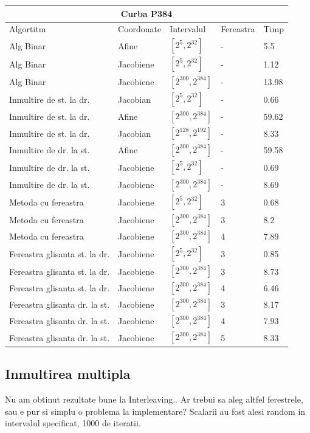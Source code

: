 \begin{tabular}{ |p{5cm}||p{3cm}|p{3cm}|p{2cm}|p{1cm}|  }
 \hline
 \multicolumn{5}{|c|}{Curba P384} \\
 \hline
 Algortitm& Coordonate &Intervalul &Fereastra &Timp\\
 \hline
 Alg Binar & Afine  &$[2^{5},2^{32}]$& - & 5.5\\
 Alg Binar&Jacobiene  & $[2^{5},2^{32}]$ & - & 1.12\\
 Alg Binar&Jacobiene  & $[2^{300},2^{384}]$ & - & 13.98\\
 Inmultire de st. la dr. & Jacobian & $[2^{5},2^{32}]$& - & 0.66\\
 Inmultire de st. la dr. & Afine & $[2^{300},2^{384}]$& - & 59.62\\
 Inmultire de st. la dr. & Jacobian & $[2^{128},2^{192}]$& - & 8.33\\
 Inmultire de dr. la st. &Afine & $[2^{300},2^{384}]$ & - & 59.58\\
 Inmultire de dr. la st. &Jacobiene & $[2^{5},2^{32}]$ & - & 0.69\\
 Inmultire de dr. la st. &Jacobiene & $[2^{300},2^{384}]$ & - & 8.69\\
 Metoda cu fereastra& Jacobiene & $[2^{5},2^{32}]$ & 3 & 0.68\\
 Metoda cu fereastra& Jacobiene & $[2^{300},2^{384}]$ & 3 & 8.2\\
 Metoda cu fereastra& Jacobiene & $[2^{300},2^{384}]$ & 4 & 7.89\\
 Fereastra glisanta st. la dr.& Jacobiene  & $[2^{5},2^{32}]$& 3 & 0.85\\
 Fereastra glisanta st. la dr.& Jacobiene  & $[2^{300},2^{384}]$& 3 & 8.73\\
  Fereastra glisanta st. la dr.& Jacobiene  & $[2^{300},2^{384}]$& 4 & 6.46\\
 Fereastra glisanta dr. la st.& Jacobiene  & $[2^{300},2^{384}]$& 3 & 8.17\\
 Fereastra glisanta dr. la st.& Jacobiene  & $[2^{300},2^{384}]$& 4 & 7.93\\
 Fereastra glisanta dr. la st.& Jacobiene  & $[2^{300},2^{384}]$& 5 & 8.33\\
 \hline
\end{tabular}	

\subsection{Inmultirea multipla}
\label{subsec:subsec04}
Nu am obtinut rezultate bune la Interleaving.. Ar trebui sa aleg altfel ferestrele, sau e pur si simplu o problema la implementare? Scalarii au fost alesi random in intervalul specificat, 1000 de iteratii.

